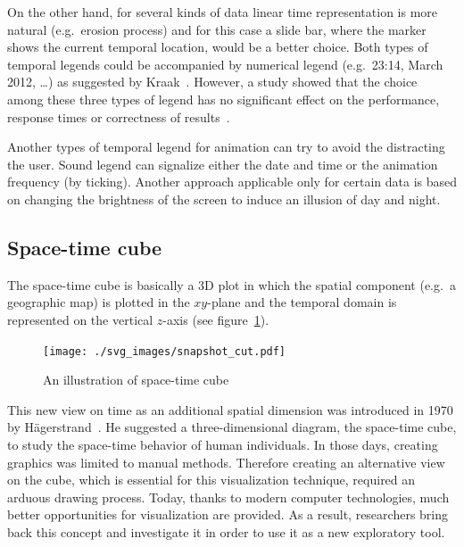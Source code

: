 \documentclass[a4paper,12pt,oneside]{book}
\begin{document}
On the other hand, for several kinds of data linear time representation is more natural (e.g.\ erosion process)
and for this case a slide bar, where the marker shows the current temporal location, would be a better choice.
Both types of temporal legends could be accompanied by numerical legend (e.g.\ 23:14,  March 2012, \ldots)
as suggested by Kraak~\cite{kraak1997cartographic}.
However, a study showed that the choice among these three types of legend has no significant effect on
the performance, response times or correctness of results~\cite{edsall1997assessing}.

Another types of temporal legend for animation can try to avoid the distracting the user.
Sound legend can signalize either the date and time or the animation frequency (by ticking).
Another approach applicable only for certain data is based on changing the brightness of the screen
to induce an illusion of day and night.


\subsection{Space-time cube}
\label{sec:stcube}
The space-time cube is basically a 3D plot in which the spatial component (e.g.\ a geographic map)
is plotted in the $xy$\nobreakdash-plane and the temporal domain is represented
on the vertical $z$-axis (see figure~\ref{fig:stcube_cut}).

\begin{figure}[h!]
  \centering
  \texttt{[image: ./svg\_images/snapshot\_cut.pdf]}
  \caption{An illustration of space-time cube}
  \label{fig:stcube_cut}
\end{figure}

This new view on time as an additional spatial dimension was introduced in 1970 by Hägerstrand~\cite{hagerstrand1970}.
He suggested a three-dimensional diagram, the space-time cube, to study the space-time behavior of human individuals.
In those days, creating graphics was limited to manual methods.
Therefore creating an alternative view on the cube, which is essential for this visualization technique,
required an arduous drawing process. Today, thanks to modern computer technologies, much better opportunities
for visualization are provided. As a result, researchers bring back this concept and
investigate it in order to use it as a new exploratory tool.
\end{document}
